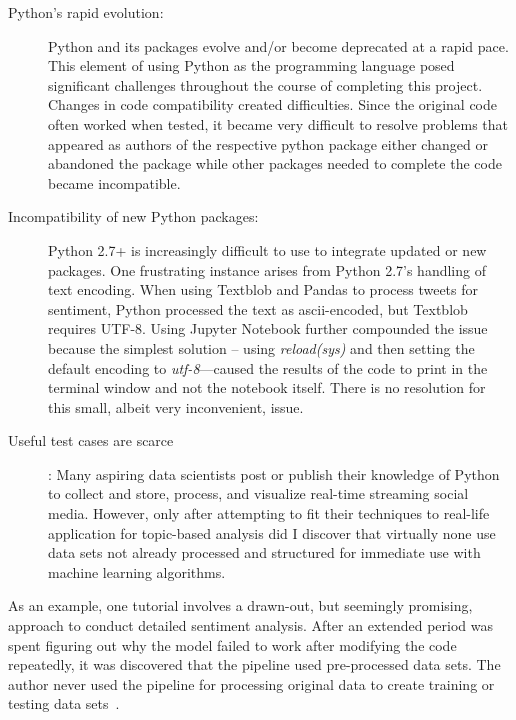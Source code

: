 \begin{description}
\item[Python's rapid evolution:] Python and its packages evolve and/or
  become deprecated at a rapid pace.  This element of using Python as
  the programming language posed significant challenges throughout the
  course of completing this project.  Changes in code compatibility
  created difficulties.  Since the original code often worked when
  tested, it became very difficult to resolve problems that appeared
  as authors of the respective python package either changed or
  abandoned the package while other packages needed to complete the
  code became incompatible.

\item[Incompatibility of new Python packages:] Python 2.7+ is
  increasingly difficult to use to integrate updated or new packages.
  One frustrating instance arises from Python 2.7's handling of text
  encoding.  When using Textblob and Pandas to process tweets for
  sentiment, Python processed the text as ascii-encoded, but Textblob
  requires UTF-8.  Using Jupyter Notebook further compounded the issue
  because the simplest solution – using \emph{reload(sys)} and then
  setting the default encoding to \emph{utf-8}—caused the results of
  the code to print in the terminal window and not the notebook
  itself.  There is no resolution for this small, albeit very
  inconvenient, issue.

\item[Useful test cases are scarce]: Many aspiring data scientists
  post or publish their knowledge of Python to collect and store,
  process, and visualize real-time streaming social media.  However,
  only after attempting to fit their techniques to real-life
  application for topic-based analysis did I discover that virtually
  none use data sets not already processed and structured for
  immediate use with machine learning algorithms.
\end{description}

As an example, one tutorial involves a drawn-out, but seemingly
promising, approach to conduct detailed sentiment analysis.  After an
extended period was spent figuring out why the model failed to work
after modifying the code repeatedly, it was discovered that the
pipeline used pre-processed data sets.  The author never used the
pipeline for processing original data to create training or testing
data sets~\cite{cranfill2017}.


